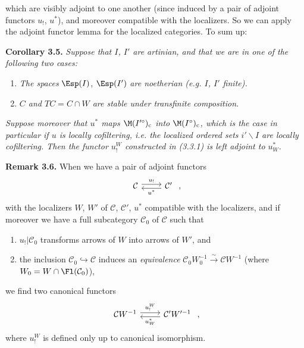 which are visibly adjoint to one another (since induced by a pair of adjoint functors %
$u_!$, $u^*$), and moreover compatible with the localizers. So we can apply the adjoint functor lemma for the localized categories. To sum up:

\textbf{Corollary 3.5.} \textit{Suppose that $I$, $I'$ are artinian, and that we are in one of the following two cases:}
\begin{enumerate}
\item[a)] \textit{The spaces} $\Esp(I)$, $\Esp(I')$ \textit{are noetherian (e.g. $I$, $I'$ finite).}
\item[b)] \textit{$C$ and $TC = C\cap W$ are stable under transfinite composition.}
\end{enumerate}
\textit{Suppose moreover that $u^*$ maps $\M(I'^\circ)_{\mathrm{c}}$ into $\M(I^\circ)_{\mathrm{c}}$, which is the case in particular if $u$ is locally cofiltering, i.e. the localized ordered sets $i'\backslash I$ are locally cofiltering. Then the functor $u_!^W$ constructed in (3.3.1) is left adjoint to $u_W^*$.}

\textbf{Remark 3.6.} When we have a pair of adjoint functors
\[
\begin{tikzcd}
\mathcal{C} \arrow[r, shift left, "u_!"] & \mathcal{C}' \arrow[l, shift left, "u^*"]
\end{tikzcd}
\ ,
\]
with the localizers $W$, $W'$ of $\mathcal{C}$, $\mathcal{C}'$, $u^*$ compatible with the localizers, and if moreover we have a full subcategory $\mathcal{C}_0$ of $\mathcal{C}$ such that
\begin{enumerate}
\item[a)] $u_!|\mathcal{C}_0$ transforms arrows of $W$ into arrows of $W'$, and
\item[b)] the inclusion $\mathcal{C}_0 \hookrightarrow \mathcal{C}$ induces an \textit{equivalence} $\mathcal{C}_0W_0^{-1} \xrightarrow{\sim} \mathcal{C}W^{-1}$ (where $W_0 = W\cap\Fl(\mathcal{C}_0)$),
\end{enumerate}
we find two canonical functors
\[
\begin{tikzcd}
\mathcal{C}W^{-1} \arrow[r, shift left, "u_!^W"] & \mathcal{C}'W'^{-1} \arrow[l, shift left, "u_W^*"]
\end{tikzcd}
\ ,
\]
where $u_!^W$ is defined only up to canonical isomorphism.

